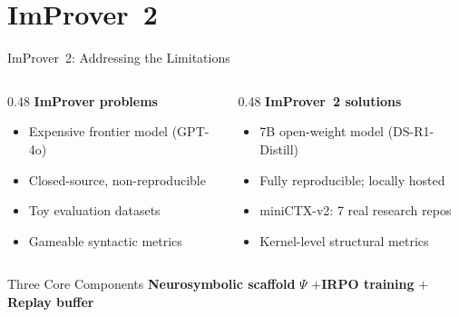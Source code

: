 \section{ImProver~2}

\begin{frame}{ImProver~2: Addressing the Limitations}
\vspace{0.3em}
\begin{columns}[T]
\begin{column}{0.48\textwidth}
\textbf{ImProver problems}\\[0.4em]
\begin{itemize}\setlength{\itemsep}{6pt}
  \item[\bad{$\times$}] Expensive frontier model (GPT-4o)
  \item[\bad{$\times$}] Closed-source, non-reproducible
  \item[\bad{$\times$}] Toy evaluation datasets
  \item[\bad{$\times$}] Gameable syntactic metrics
\end{itemize}
\end{column}
\begin{column}{0.48\textwidth}
\textbf{ImProver~2 solutions}\\[0.4em]
\begin{itemize}\setlength{\itemsep}{6pt}
  \item[\good{$\checkmark$}] 7B open-weight model (DS-R1-Distill)
  \item[\good{$\checkmark$}] Fully reproducible; locally hosted
  \item[\good{$\checkmark$}] miniCTX-v2: 7 real research repos
  \item[\good{$\checkmark$}] Kernel-level structural metrics
\end{itemize}
\end{column}
\end{columns}
\vspace{0.5em}
\begin{block}{Three Core Components}
  \textbf{Neurosymbolic scaffold} $\Psi$ \quad$+$\quad \textbf{IRPO training} \quad$+$\quad \textbf{Replay buffer}
\end{block}
\end{frame}


